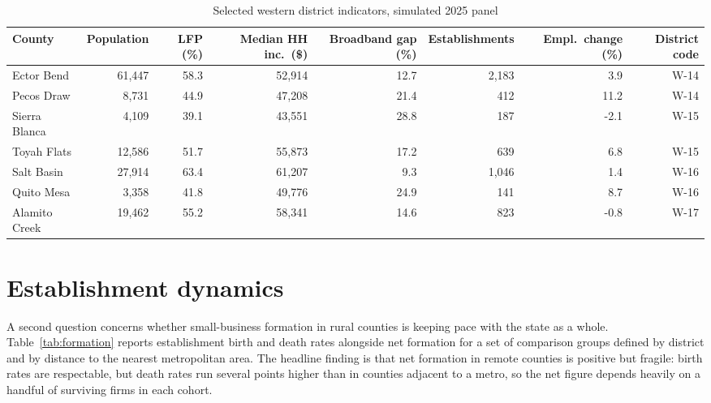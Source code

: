 \documentclass[11pt]{article}
\begin{document}
\begin{table}
\centering
\caption{Selected western district indicators, simulated 2025 panel}
\label{tab:western}
\begin{tabular}{lrrrrrrr}
\toprule
County & Population & LFP (\%) & Median HH inc.\ (\$) & Broadband gap (\%) & Establishments & Empl.\ change (\%) & District code \\
\midrule
Ector Bend    & 61,447 & 58.3 & 52,914 & 12.7 & 2,183 &  3.9 & W-14 \\
Pecos Draw    &  8,731 & 44.9 & 47,208 & 21.4 &   412 & 11.2 & W-14 \\
Sierra Blanca &  4,109 & 39.1 & 43,551 & 28.8 &   187 & -2.1 & W-15 \\
Toyah Flats   & 12,586 & 51.7 & 55,873 & 17.2 &   639 &  6.8 & W-15 \\
Salt Basin    & 27,914 & 63.4 & 61,207 &  9.3 & 1,046 &  1.4 & W-16 \\
Quito Mesa    &  3,358 & 41.8 & 49,776 & 24.9 &   141 &  8.7 & W-16 \\
Alamito Creek & 19,462 & 55.2 & 58,341 & 14.6 &   823 & -0.8 & W-17 \\
\bottomrule
\end{tabular}
\end{table}

\section{Establishment dynamics}

A second question concerns whether small-business formation in rural counties
is keeping pace with the state as a whole. Table~\ref{tab:formation} reports
establishment birth and death rates alongside net formation for a set of
comparison groups defined by district and by distance to the nearest
metropolitan area. The headline finding is that net formation in remote
counties is positive but fragile: birth rates are respectable, but death rates
run several points higher than in counties adjacent to a metro, so the net
figure depends heavily on a handful of surviving firms in each cohort.
\end{document}
